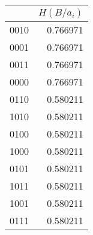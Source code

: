 \begin{tabular}{lr}
\toprule
 & $H(B/a_i)$ \\
\midrule
0010 & 0.766971 \\
0001 & 0.766971 \\
0011 & 0.766971 \\
0000 & 0.766971 \\
0110 & 0.580211 \\
1010 & 0.580211 \\
0100 & 0.580211 \\
1000 & 0.580211 \\
0101 & 0.580211 \\
1011 & 0.580211 \\
1001 & 0.580211 \\
0111 & 0.580211 \\
\bottomrule
\end{tabular}
